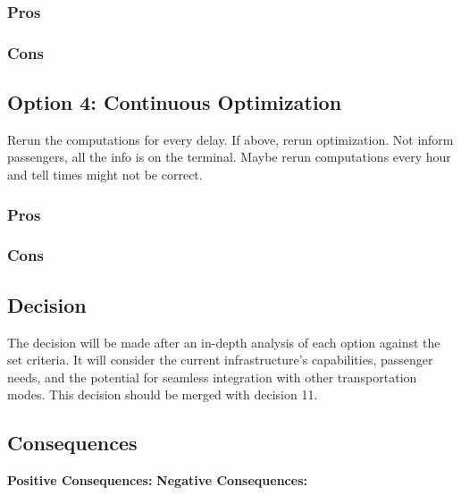 \subsubsection*{Pros}
\subsubsection*{Cons}

\subsection*{Option 4: Continuous Optimization}
Rerun the computations for every delay. If above, rerun optimization. Not inform passengers, all the info is on the terminal. Maybe rerun computations every hour and tell times might not be correct.
\subsubsection*{Pros}
\subsubsection*{Cons}

\subsection*{Decision}
The decision will be made after an in-depth analysis of each option against the set criteria. It will consider the current infrastructure's capabilities, passenger needs, and the potential for seamless integration with other transportation modes. This decision should be merged with decision 11.

\subsection*{Consequences}
\textbf{Positive Consequences:}
\textbf{Negative Consequences:}
